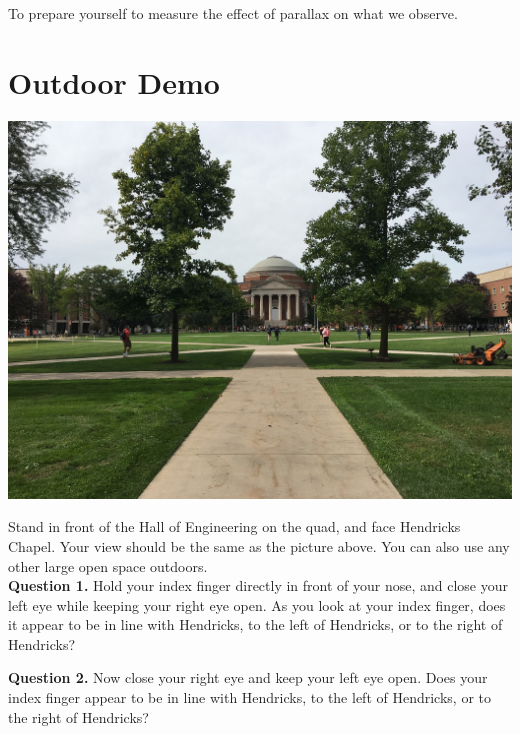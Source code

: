 \documentclass[11pt]{article}
\begin{document}
To prepare yourself to measure the effect of parallax on what we observe.

\newpage

\section{Outdoor Demo}

\begin{center}
	\includegraphics[width=150mm, scale=0.5]{Hall_of_Engineering}
\end{center}
Stand in front of the Hall of Engineering on the quad, and face Hendricks Chapel. Your view should be the same as the picture above. You can also use any other large open space outdoors.\\ 

\textbf{Question 1.} Hold your index finger directly in front of your nose, and close your left eye while keeping your right eye open. As you look at your index finger, does it appear to be in line with Hendricks, to the left of Hendricks, or to the right of Hendricks?\\

\vspace*{1.5cm}
\hrulefill

\newpage

\textbf{Question 2.} Now close your right eye and keep your left eye open. Does your index finger appear to be in line with Hendricks, to the left of Hendricks, or to the right of Hendricks?\\

\vspace*{1.5cm}
\hrulefill\\
\end{document}
